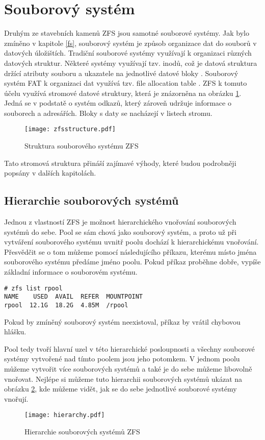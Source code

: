 \section{Souborový systém}
Druhým ze stavebních kamenů ZFS jsou samotné souborové systémy. Jak bylo zmíněno v kapitole \ref{fs}, souborový systém je způsob organizace dat do souborů v datových úložištích.
Tradiční souborové systémy využívají k organizaci různých datových struktur. Některé systémy využívají tzv. inodů, což je datová struktura držící atributy souboru a ukazatele na jednotlivé datové bloky \cite{fs}. Souborový systém FAT k organizaci dat využívá tzv. file allocation table \cite{fs}. ZFS k tomuto účelu využívá stromové datové struktury, která je znázorněna na obrázku \ref{structure}. Jedná se v podstatě o systém odkazů, který zároveň udržuje informace o souborech a adresářích. Bloky s daty se nacházejí v listech stromu.
\begin{figure}
    \centering
    \texttt{[image: zfsstructure.pdf]}
    \caption{Struktura souborového systému ZFS}
    \label{structure}
\end{figure}

Tato stromová struktura přináší zajímavé výhody, které budou podrobněji popsány v dalších kapitolách.

\subsection{Hierarchie souborových systémů}
\label{hiararchy}
Jednou z vlastností ZFS je možnost hierarchického vnořování souborových systémů do sebe. Pool se sám chová jako souborový systém, a proto už při vytváření souborového systému uvnitř poolu dochází k hierarchickému vnořování. Přesvědčit se o tom můžeme pomocí následujícího příkazu, kterému místo jména souborového systému předáme jméno poolu. Pokud příkaz proběhne dobře, vypíše základní informace o souborovém systému.
\begin{verbatim}
# zfs list rpool
NAME    USED  AVAIL  REFER  MOUNTPOINT
rpool  12.1G  18.2G  4.85M  /rpool
\end{verbatim}
Pokud by zmíněný souborový systém neexistoval, příkaz by vrátil chybovou hlášku.

Pool tedy tvoří hlavní uzel v této hierarchické posloupnosti a všechny souborové systémy vytvořené nad tímto poolem jsou jeho potomkem. V jednom poolu můžeme vytvořit více souborových systémů a také je do sebe můžeme libovolně vnořovat. Nejlépe si můžeme tuto hierarchii souborových systémů ukázat na obrázku \ref{fshierarchy}, kde můžeme vidět, jak se do sebe jednotlivé souborové systémy vnořují.
\begin{figure}[b]
    \centering
    \texttt{[image: hierarchy.pdf]}
    \caption{Hierarchie souborových systémů ZFS}
    \label{fshierarchy}
\end{figure}

